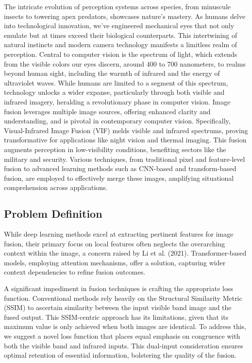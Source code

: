 \label{chp:introduction}
The intricate evolution of perception systems across species, from minuscule insects to towering apex predators, showcases nature's mastery. As humans delve into technological innovation, we've engineered mechanical eyes that not only emulate but at times exceed their biological counterparts. This intertwining of natural instincts and modern camera technology manifests a limitless realm of perception. Central to computer vision is the spectrum of light, which extends from the visible colors our eyes discern, around 400 to 700 nanometers, to realms beyond human sight, including the warmth of infrared and the energy of ultraviolet waves. While humans are limited to a segment of this spectrum, technology unlocks a wider expanse, particularly through both visible and infrared imagery, heralding a revolutionary phase in computer vision. Image fusion leverages multiple image sources, offering enhanced clarity and understanding, and is pivotal in contemporary computer vision. Specifically, Visual-Infrared Image Fusion (VIF) melds visible and infrared spectrums, proving transformative for applications like night vision and thermal imaging. This fusion augments perception in low-visibility conditions, benefiting sectors like the military and security. Various techniques, from traditional pixel and feature-level fusion to advanced learning methods such as CNN-based and transform-based fusion, are employed to effectively merge these images, amplifying situational comprehension across applications.

\subsection{Problem Definition}\label{sec:probdef}

While deep learning methods excel at extracting pertinent features for image fusion, their primary focus on local features often neglects the overarching context within the image, a concern raised by Li et al. (2021)\cite{li2021rfn}. Transformer-based models, employing attention mechanisms, offer a solution, capturing wider context dependencies to refine fusion outcomes.

A significant impediment in fusion techniques is crafting the appropriate loss function. Conventional methods rely heavily on the Structural Similarity Metric (SSIM) to ascertain similarity between the input visible band image and the fused output. This SSIM-centric approach has its limitations, given that its maximum value is only achieved when both images are identical. To address this, we suggest a novel loss function that places equal emphasis on congruence with both the visible band and infrared inputs. This dual-input consideration ensures optimal retention of essential information, bolstering the quality of the fusion.

